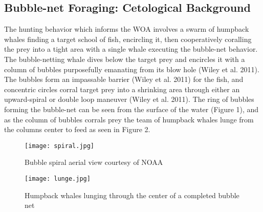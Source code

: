 \documentclass[11pt]{article}
\begin{document}
\subsection*{Bubble-net Foraging: Cetological Background} {
    The hunting behavior which informs the WOA involves a swarm of humpback whales finding a target school of fish, encircling it, then cooperatively coralling the prey into a tight area with a single whale executing the bubble-net behavior.
    The bubble-netting whale dives below the target prey and encircles it with a column of bubbles purposefully emanating from its blow hole (Wiley et al. 2011).
    The bubbles form an impassable barrier (Wiley et al. 2011) for the fish, and concentric circles corral target prey into a shrinking area through either an upward-spiral or double loop maneuver (Wiley et al. 2011).
    The ring of bubbles forming the bubble-net can be seen from the surface of the water (Figure 1), and as the column of bubbles corrals prey the team of humpback whales lunge from the columns center to feed as seen in Figure 2.

    \begin{figure}[h]
        \centering
        \caption{Bubble spiral aerial view courtesy of NOAA}
        \texttt{[image: spiral.jpg]}
    \end{figure}

    \begin{figure}[h]
        \centering
        \caption{Humpback whales lunging through the center of a completed bubble net}
        \texttt{[image: lunge.jpg]}
    \end{figure}
}
\end{document}
